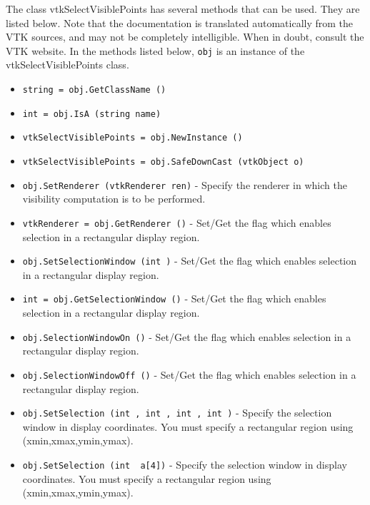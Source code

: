 The class vtkSelectVisiblePoints has several methods that can be used.
  They are listed below.
Note that the documentation is translated automatically from the VTK sources,
and may not be completely intelligible.  When in doubt, consult the VTK website.
In the methods listed below, \verb|obj| is an instance of the vtkSelectVisiblePoints class.
\begin{itemize}
\item  \verb|string = obj.GetClassName ()|

\item  \verb|int = obj.IsA (string name)|

\item  \verb|vtkSelectVisiblePoints = obj.NewInstance ()|

\item  \verb|vtkSelectVisiblePoints = obj.SafeDownCast (vtkObject o)|

\item  \verb|obj.SetRenderer (vtkRenderer ren)| -  Specify the renderer in which the visibility computation is to be
 performed.

\item  \verb|vtkRenderer = obj.GetRenderer ()| -  Set/Get the flag which enables selection in a rectangular display
 region.

\item  \verb|obj.SetSelectionWindow (int )| -  Set/Get the flag which enables selection in a rectangular display
 region.

\item  \verb|int = obj.GetSelectionWindow ()| -  Set/Get the flag which enables selection in a rectangular display
 region.

\item  \verb|obj.SelectionWindowOn ()| -  Set/Get the flag which enables selection in a rectangular display
 region.

\item  \verb|obj.SelectionWindowOff ()| -  Set/Get the flag which enables selection in a rectangular display
 region.

\item  \verb|obj.SetSelection (int , int , int , int )| -  Specify the selection window in display coordinates. You must specify
 a rectangular region using (xmin,xmax,ymin,ymax).

\item  \verb|obj.SetSelection (int  a[4])| -  Specify the selection window in display coordinates. You must specify
 a rectangular region using (xmin,xmax,ymin,ymax).


\end{itemize}
